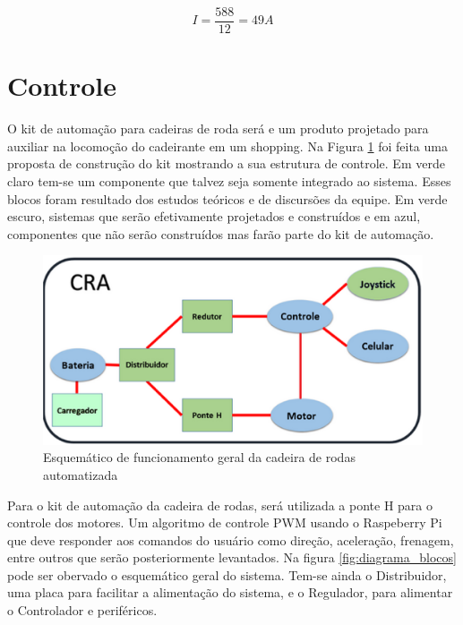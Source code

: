 \begin{equation}
I = \frac{588}{12} = 49A
\end{equation}

\section{Controle}

O kit de automação para cadeiras de roda será e um produto projetado para auxiliar na locomoção do cadeirante em um shopping. Na Figura \ref{fig:esquema_controle} foi feita uma proposta de construção do kit mostrando a sua estrutura de controle. Em verde claro tem-se um componente que talvez seja somente integrado ao sistema. Esses blocos foram resultado dos estudos teóricos e de discursões da equipe. Em verde escuro, sistemas que serão efetivamente projetados e construídos e em azul, componentes que não serão construídos mas farão parte do kit de automação.

\begin{figure}[!htb]
\centering
  \includegraphics[keepaspectratio=true,scale=0.6]{figuras/controle/esquema_controle}
\caption{Esquemático de funcionamento geral da cadeira de rodas automatizada}
\label{fig:esquema_controle}
\end{figure}


Para o kit de automação da cadeira de rodas, será utilizada a ponte H para o controle dos motores. Um algoritmo de controle PWM usando o Raspeberry Pi que deve responder aos comandos do usuário como direção, aceleração, frenagem, entre outros que serão posteriormente levantados. Na figura \ref{fig:diagrama_blocos} pode ser obervado o esquemático geral do sistema. Tem-se ainda o Distribuidor, uma placa para facilitar a alimentação do sistema, e o Regulador, para alimentar o Controlador e periféricos.


